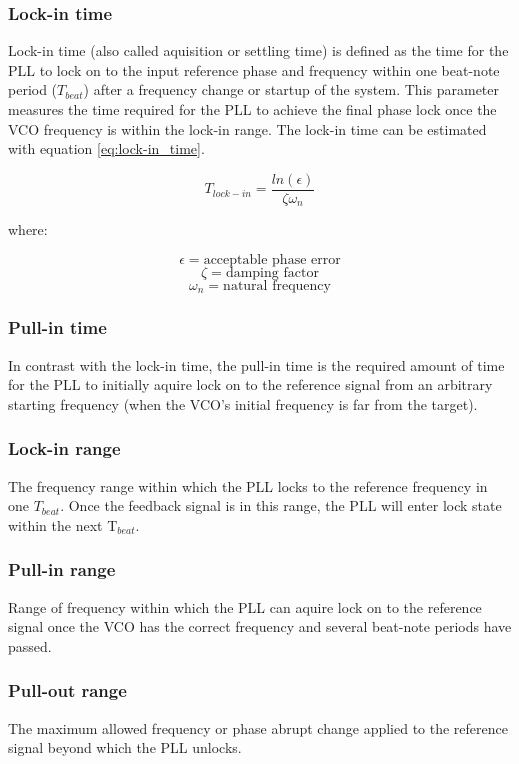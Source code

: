 \subsubsection{Lock-in time}
Lock-in time (also called aquisition or settling time) is defined as the time for the PLL to lock on to the input reference phase and frequency within one 
beat-note period ($T_{beat}$) after a frequency change or startup of the system. This parameter measures the time required for the PLL
to achieve the final phase lock once the VCO frequency is within the lock-in range. The lock-in time can be estimated with equation
\eqref{eq:lock-in_time}.

\begin{equation}
    T_{lock-in} = \frac{ln(\epsilon)}{\zeta \omega_{n}}
    \label{eq:lock-in_time}
\end{equation}

where:

\[\epsilon = \text{acceptable phase error}\]
\[\zeta = \text{damping factor}\]
\[\omega_{n} = \text{natural frequency}\]


\subsubsection{Pull-in time}
In contrast with the lock-in time, the pull-in time is the required amount of time for the PLL to initially aquire lock on to the 
reference signal from an arbitrary starting frequency (when the VCO's initial frequency is far from the target).
\subsubsection{Lock-in range}
The frequency range within which the PLL locks to the reference frequency in one $T_{beat}$. Once the feedback signal is in this 
range, the PLL will enter lock state within the next T$_{beat}$.
\subsubsection{Pull-in range}
Range of frequency within which the PLL can aquire lock on to the reference signal once the VCO has the correct frequency and several 
beat-note periods have passed.
\subsubsection{Pull-out range}
The maximum allowed frequency or phase abrupt change applied to the reference signal beyond which the PLL unlocks.

